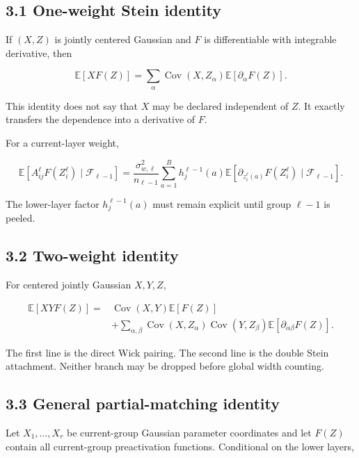 \subsection*{3.1 One-weight Stein identity}


If \((X,Z)\) is jointly centered Gaussian and \(F\) is differentiable with
integrable derivative, then

\[
\mathbb E[X F(Z)]
=
\sum_\alpha
\operatorname{Cov}(X,Z_\alpha)
\mathbb E[\partial_\alpha F(Z)].
\]


This identity does not say that \(X\) may be declared independent of \(Z\).
It exactly transfers the dependence into a derivative of \(F\).

For a current-layer weight,

\[
\mathbb E
\left[
A^\ell_{ij}F(Z_i^\ell)
\mid\mathcal F_{\ell-1}
\right]
=
\frac{\sigma_{w,\ell}^2}{n_{\ell-1}}
\sum_{a=1}^B
h_j^{\ell-1}(a)
\mathbb E
\left[
\partial_{z_i^\ell(a)}F(Z_i^\ell)
\mid\mathcal F_{\ell-1}
\right].
\]


The lower-layer factor \(h_j^{\ell-1}(a)\) must remain explicit until group
\(\ell-1\) is peeled.

\subsection*{3.2 Two-weight identity}


For centered jointly Gaussian \(X,Y,Z\),

\[
\begin{aligned}
\mathbb E[XYF(Z)]
={}&
\operatorname{Cov}(X,Y)\mathbb E[F(Z)]
\\
&+
\sum_{\alpha,\beta}
\operatorname{Cov}(X,Z_\alpha)
\operatorname{Cov}(Y,Z_\beta)
\mathbb E[\partial_{\alpha\beta}F(Z)].
\end{aligned}
\]


The first line is the direct Wick pairing. The second line is the double Stein
attachment. Neither branch may be dropped before global width counting.

\subsection*{3.3 General partial-matching identity}


Let \(X_1,\ldots,X_r\) be current-group Gaussian parameter coordinates and
let \(F(Z)\) contain all current-group preactivation functions. Conditional on
the lower layers,

